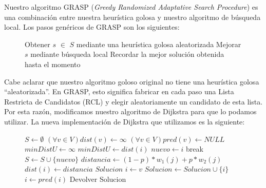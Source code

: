 Nuestro algoritmo GRASP (\emph{Greedy Randomized Adaptative Search Procedure}) es una combinación entre nuestra heurística golosa y nuestro algoritmo de búsqueda local. Los pasos genéricos de GRASP son los siguientes:

\begin{center}
 \begin{figure}[H]
  \begin{pseudo}
    \State Obtener $s$ $\in$ $S$ mediante una heurística golosa aleatorizada
    \State Mejorar $s$ mediante búsqueda local
    \State Recordar la mejor solución obtenida hasta el momento
    \EndWhile
    \EndProcedure
  \end{pseudo}
 \end{figure}
\end{center}

Cabe aclarar que nuestro algoritmo goloso original no tiene una heurística golosa ``aleatorizada''. En GRASP, esto significa fabricar en cada paso una Lista Restricta de Candidatos (RCL) y elegir aleatoriamente un candidato de esta lista. Por esta razón, modificamos nuestro algoritmo de Dijkstra para que lo podamos utilizar. La nueva implementación de Dijkstra que utilizamos es la siguiente:

\begin{center}
 \begin{figure}[H]
  \begin{pseudo}
    \State $S \leftarrow \emptyset$
    \State $(\forall v \in V) dist(v) \leftarrow \infty$
    \State $(\forall v \in V) pred(v) \leftarrow NULL$
    \State $minDistU \leftarrow \infty$
	\State $minDistU \leftarrow dist(i)$
	\State $nuevo \leftarrow i$
      \EndIf
    \EndFor
      \State break
    \EndIf
    \State $S \leftarrow S \cup \{nuevo\}$
      \State $distancia \leftarrow (1-p)*w_1(j) + p*w_2(j)$
	\State $dist(i) \leftarrow distancia$
      \EndIf
    \EndFor
    \EndWhile
    \State $Solucion$
    \State $i \leftarrow v$
      \State $Solucion \leftarrow Solucion \cup \{i\}$
      \State $i \leftarrow pred(i)$
    \EndWhile
    \State Devolver Solucion
    \EndProcedure
  \end{pseudo}
 \end{figure}
\end{center}

